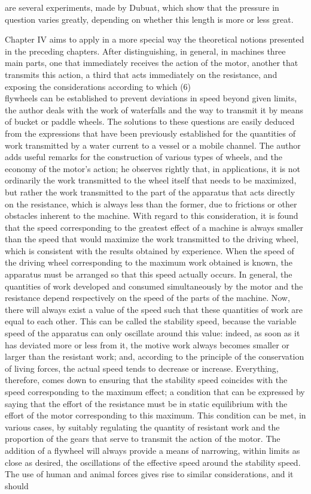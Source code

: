 \documentclass{book}
\begin{document}
are several experiments, made by Dubuat, which show that the pressure in question varies greatly, depending on whether this length is more or less great.

Chapter IV aims to apply in a more special way the theoretical notions presented in the preceding chapters. After distinguishing, in general, in machines three main parts, one that immediately receives the action of the motor, another that transmits this action, a third that acts immediately on the resistance, and exposing the considerations according to which 
\newpage
(6)\\
flywheels can be established to prevent deviations in speed beyond given limits, the author deals with the work of waterfalls and the way to transmit it by means of bucket or paddle wheels.
The solutions to these questions are easily deduced from the expressions that have been previously established for the quantities of work transmitted by a water current to a vessel or a mobile channel. The author adds useful remarks for the construction of various types of wheels, and the economy of the motor's action; he observes rightly that, in applications, it is not ordinarily the work transmitted to the wheel itself that needs to be maximized, but rather the work transmitted to the part of the apparatus that acts directly on the resistance, which is always less than the former, due to frictions or other obstacles inherent to the machine. With regard to this consideration, it is found that the speed corresponding to the greatest effect of a machine is always smaller than the speed that would maximize the work transmitted to the driving wheel, which is consistent with the results obtained by experience. When the speed of the driving wheel corresponding to the maximum work obtained is known, the apparatus must be arranged so that this speed actually occurs. In general, the quantities of work developed and consumed simultaneously by the motor and the resistance depend respectively on the speed of the parts of the machine. Now, there will always exist a value of the speed such that these quantities of work are equal to each other. This can be called the stability speed, because the variable speed of the apparatus can only oscillate around this value: indeed, as soon as it has deviated more or less from it, the motive work always becomes smaller or larger than the resistant work; and, according to the principle of the conservation of living forces, the actual speed tends to decrease or increase. Everything, therefore, comes down to ensuring that the stability speed coincides with the speed corresponding to the maximum effect; a condition that can be expressed by saying that the effort of the resistance must be in static equilibrium with the effort of the motor corresponding to this maximum. This condition can be met, in various cases, by suitably regulating the quantity of resistant work and the proportion of the gears that serve to transmit the action of the motor. The addition of a flywheel will always provide a means of narrowing, within limits as close as desired, the oscillations of the effective speed around the stability speed. The use of human and animal forces gives rise to similar considerations, and it should 
\end{document}
